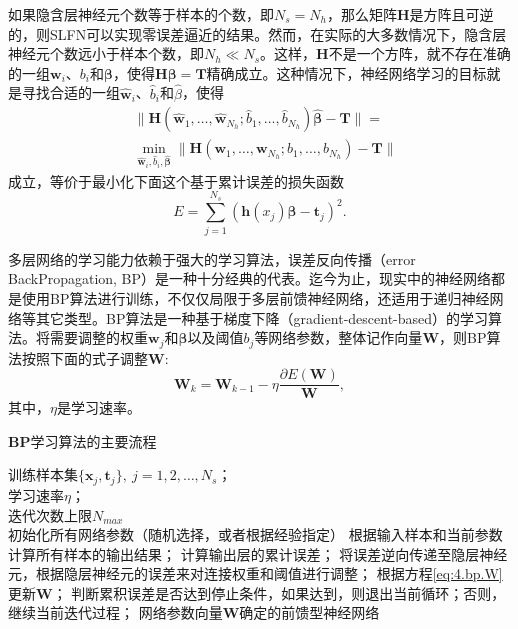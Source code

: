 如果隐含层神经元个数等于样本的个数，即$N_{s}=N_{h}$，那么矩阵$\bm{H}$是方阵且可逆的，则SLFN可以实现零误差逼近的结果。然而，在实际的大多数情况下，隐含层神经元个数远小于样本个数，即$N_{h}\ll N_{s}$。这样，$\bm{H}$不是一个方阵，就不存在准确的一组$\bm{w}_{i}$、$b_{i}$和$\bm{\beta}$，使得$\bm{H}\bm{\beta}=\bm{T}$精确成立。这种情况下，神经网络学习的目标就是寻找合适的一组$\hat{\bm{w}}_{i}$、$\hat{b}_{i}$和$\hat{\beta}$，使得
\begin{equation}\label{eq:4.nn.H-T}
\begin{split}%
&\|\bm{H}(\hat{\bm{w}}_{1},\dots,\hat{\bm{w}}_{N_{h}};\hat{b}_{1},\dots,\hat{b}_{N_{h}})\hat{\bm{\beta}}-\bm{T}\|=\\
&\min_{\hat{\bm{w}}_{i},\hat{b}_{i},\hat{\bm{\beta}}}\|\bm{H}(\bm{w}_{1},\dots,\bm{w}_{N_{h}};b_{1},\dots,b_{N_{h}})-\bm{T}\|
\end{split}
\end{equation}
成立，等价于最小化下面这个基于累计误差的损失函数
\begin{equation}\label{eq:4.nn.cost}
E=\sum_{j=1}^{N_{s}}(\bm{h}(x_{j})\bm{\beta}-\bm{t}_{j})^{2}.
\end{equation}

多层网络的学习能力依赖于强大的学习算法，误差反向传播（error BackPropagation, BP）是一种十分经典的代表。迄今为止，现实中的神经网络都是使用BP算法进行训练，不仅仅局限于多层前馈神经网络，还适用于递归神经网络等其它类型。BP算法是一种基于梯度下降（gradient-descent-based）的学习算法。将需要调整的权重$\bm{w}_{j}$和$\bm{\beta}$以及阈值$b_{j}$等网络参数，整体记作向量$\bm{W}$，则BP算法按照下面的式子调整$\bm{W}$:
\begin{equation}\label{eq:4.bp.W}
\bm{W}_{k} = \bm{W}_{k-1}-\eta\frac{\partial E(\bm{W})}{\bm{W}},
\end{equation}
其中，$\eta$是学习速率。

\begin{algo}
\caption{$\mathbf{BP}$学习算法的主要流程}
\label{alg.bp}
\begin{algorithmic}%
\REQUIRE 训练样本集$\{\bm{x}_{j},\bm{t}_{j}\},\ j=1,2,\ldots,N_{s}$；\\
学习速率$\eta$；\\
迭代次数上限$N_{max}$\\
\STATE 初始化所有网络参数（随机选择，或者根据经验指定）
  \STATE 根据输入样本和当前参数计算所有样本的输出结果；
  \STATE 计算输出层的累计误差；
  \STATE 将误差逆向传递至隐层神经元，根据隐层神经元的误差来对连接权重和阈值进行调整；
  \STATE 根据方程\eqref{eq:4.bp.W}更新$\bm{W}$；
  \STATE 判断累积误差是否达到停止条件，如果达到，则退出当前循环；否则，继续当前迭代过程；
\ENDFOR
\ENSURE 网络参数向量$\bm{W}$确定的前馈型神经网络\\
\end{algorithmic}
\end{algo}

